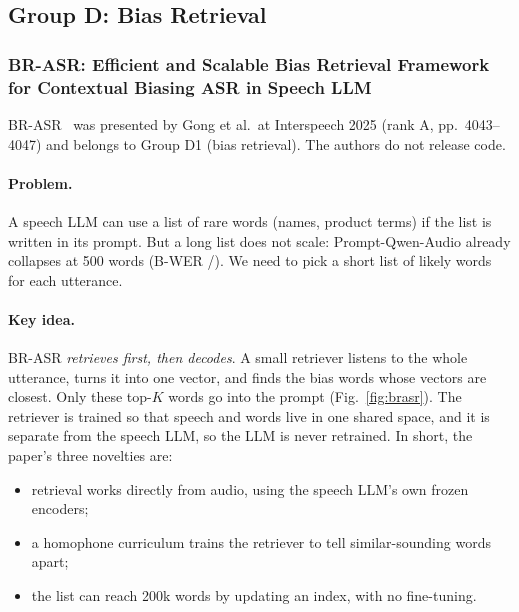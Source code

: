 \subsection{Group D: Bias Retrieval}

\subsubsection{BR-ASR: Efficient and Scalable Bias Retrieval Framework for Contextual Biasing ASR in Speech LLM}
BR-ASR~\cite{gong2025brasr} was presented by Gong et al.\ at Interspeech 2025 (rank A, pp.~4043--4047) and belongs to
Group D1 (bias retrieval). The authors do not release code.

\paragraph{Problem.} A speech LLM can use a list of rare words (names, product terms) if the list is written in its prompt.
But a long list does not scale: Prompt-Qwen-Audio already collapses at 500 words (B-WER /).
We need to pick a short list of likely words for each utterance.

\paragraph{Key idea.} BR-ASR \emph{retrieves first, then decodes}. A small retriever listens to the whole utterance, turns it into one vector,
and finds the bias words whose vectors are closest. Only these top-$K$ words go into the prompt (Fig.~\ref{fig:brasr}).
The retriever is trained so that speech and words live in one shared space, and it is separate from the speech LLM, so the LLM is never retrained.
In short, the paper's three novelties are:
\begin{itemize}
  \item retrieval works directly from audio, using the speech LLM's own frozen encoders;
  \item a homophone curriculum trains the retriever to tell similar-sounding words apart;
  \item the list can reach 200k words by updating an index, with no fine-tuning.
\end{itemize}

